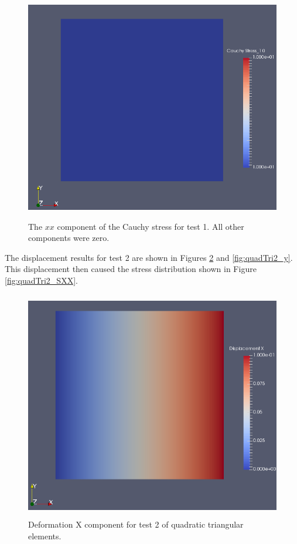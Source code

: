 \documentclass[a4paper, 12pt]{article}
\begin{document}
\begin{figure}[H]
  \centering
  \includegraphics[width=13cm, height=10cm]{Qtri_4_t1_Sxx}
  \caption{The $xx$ component of the Cauchy stress for test 1.
            All other components were zero.}
  \label{fig:quadTri1_SXX}
\end{figure}

The displacement results for test 2 are shown in 
Figures \ref{fig:quadTri2_x} and \ref{fig:quadTri2_y}.
This displacement then caused the stress distribution 
shown in Figure \ref{fig:quadTri2_SXX}.

\begin{figure}[H]
  \centering
  \includegraphics[width=13cm, height=10cm]{Qtri_4_t2_disp_X}
  \caption{Deformation X component for test 2 of quadratic
            triangular elements.}
  \label{fig:quadTri2_x}
\end{figure}
\end{document}
